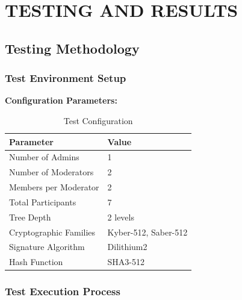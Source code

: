 \documentclass[12pt,a4paper]{report}
\begin{document}
\chapter{TESTING AND RESULTS}

\section{Testing Methodology}

\subsection{Test Environment Setup}

\textbf{Configuration Parameters:}

\begin{table}[H]
\centering
\caption{Test Configuration}
\begin{tabular}{|l|l|}
\hline
\textbf{Parameter} & \textbf{Value} \\
\hline
Number of Admins & 1 \\
Number of Moderators & 2 \\
Members per Moderator & 2 \\
Total Participants & 7 \\
Tree Depth & 2 levels \\
Cryptographic Families & Kyber-512, Saber-512 \\
Signature Algorithm & Dilithium2 \\
Hash Function & SHA3-512 \\
\hline
\end{tabular}
\end{table}

\subsection{Test Execution Process}
\end{document}

